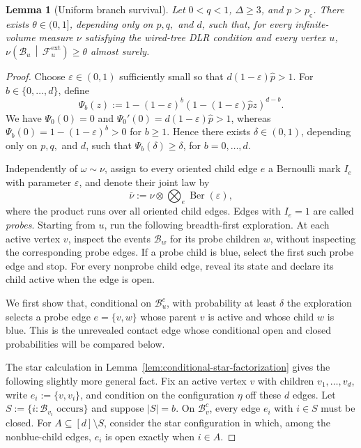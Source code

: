 \documentclass[10pt,a4paper]{amsart}
\newtheorem{lemma}{Lemma}
\newcommand{\pc}{p_{\mathsf{c}}}
\begin{document}
\begin{lemma}[Uniform branch survival]
\label{lem:uniform-branch-survival}
Let $0<q<1$, $\Delta\ge3$, and $p>\pc$. There exists $\theta\in(0,1]$, depending only on $p,q,$ and $d$, such that, for every infinite-volume measure $\nu$ satisfying the wired-tree DLR condition and every vertex $u$, $\nu\left(\mathcal B_u\,\middle|\,\mathcal F_u^{\mathrm{ext}}\right)\ge\theta $ almost surely.
\end{lemma}

\begin{proof}
Choose $\varepsilon\in(0,1)$ sufficiently small so that $d(1-\varepsilon)\widehat p>1$. For $b\in\{0,\ldots,d\}$, define
\[
    \Psi_b(z)
    :=
    1-(1-\varepsilon)^b
    \left(
        1-(1-\varepsilon)\widehat p z
    \right)^{d-b}.
\]
We have $\Psi_0(0)=0$ and $\Psi_0'(0)=d(1-\varepsilon)\widehat p>1$, whereas $\Psi_b(0)=1-(1-\varepsilon)^b>0$ for $b\ge1$. Hence there exists $\delta\in(0,1)$, depending only on $p,q,$ and $d$, such that $\Psi_b(\delta)\ge\delta$, for $b=0,\ldots,d$.

Independently of $\omega\sim\nu$, assign to every oriented child edge $e$ a Bernoulli mark $I_e$ with parameter $\varepsilon$, and denote their joint law by
\[
    \overline\nu
    :=
    \nu
    \otimes
    \bigotimes_e \operatorname{Ber}(\varepsilon),
\]
where the product runs over all oriented child edges. Edges with $I_e=1$ are called \emph{probes}. Starting from $u$, run the following breadth-first exploration. At each active vertex $v$, inspect the events $\mathcal B_w$ for its probe children $w$, without inspecting the corresponding probe edges. If a probe child is blue, select the first such probe edge and stop. For every nonprobe child edge, reveal its state and declare its child active when the edge is open.

We first show that, conditional on $\mathcal B_u^c$, with probability at least $\delta$ the exploration selects a probe edge $e=\{v,w\}$ whose parent $v$ is active and whose child $w$ is blue. This is the unrevealed contact edge whose conditional open and closed probabilities will be compared below.

The star calculation in Lemma~\ref{lem:conditional-star-factorization} gives the following slightly more general fact. Fix an active vertex $v$ with children $v_1,\ldots,v_d$, write $e_i:=\{v,v_i\}$, and condition on the configuration $\eta$ off these $d$ edges. Let $S:=\{i:\mathcal B_{v_i}\text{ occurs}\}$ and suppose $|S|=b$. On $\mathcal B_v^c$, every edge $e_i$ with $i\in S$ must be closed. For $A\subseteq[d]\setminus S$, consider the star configuration in which, among the nonblue-child edges, $e_i$ is open exactly when $i\in A$. 


\end{proof}
\end{document}
